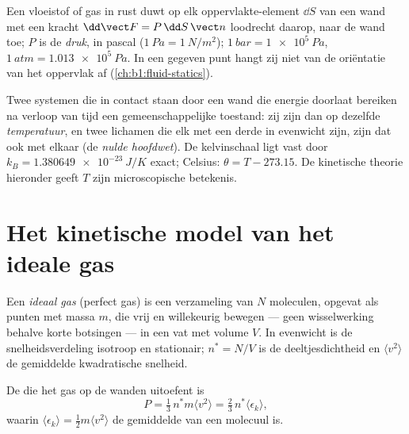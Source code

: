 \begin{definition}[Druk]\label{def:b1:kinetic-theory:pressure}
Een vloeistof of gas in rust duwt op elk oppervlakte-element $\dd S$ van een wand met een
kracht $\dd\vect F = P\,\dd S\,\vect n$ loodrecht daarop, naar de wand toe; $P$ is
de \emph{druk}, in pascal ($\qty{1}{Pa} = \qty{1}{N/m^2}$); $\qty{1}{bar}
= \qty{1e5}{Pa}$, $\qty{1}{atm} = \qty{1.013e5}{Pa}$. In een gegeven punt hangt zij
niet van de oriëntatie van het oppervlak af (\cref{ch:b1:fluid-statics}).
\end{definition}

\begin{definition}[Temperatuur]\label{def:b1:kinetic-theory:temperature}
Twee systemen die in contact staan door een wand die energie doorlaat bereiken na
verloop van tijd een gemeenschappelijke toestand: zij zijn dan op dezelfde \emph{temperatuur}, en
twee lichamen die elk met een derde in evenwicht zijn, zijn dat ook met
elkaar (de \emph{nulde hoofdwet}). De kelvinschaal ligt vast door
$k_B = \qty{1.380649e-23}{J/K}$ exact; Celsius: $\theta = T - 273.15$. De
kinetische theorie hieronder geeft $T$ zijn microscopische betekenis.
\end{definition}

\section{Het kinetische model van het ideale gas}

\begin{definition}\label{def:b1:kinetic-theory:model}
Een \emph{ideaal gas} (perfect gas) is een verzameling van $N$ moleculen,
opgevat als punten met massa $m$, die vrij en willekeurig bewegen --- geen
wisselwerking behalve korte botsingen --- in een vat met volume $V$.
In evenwicht is de snelheidsverdeling isotroop en stationair;
$n^* = N/V$ is de deeltjesdichtheid en $\langle v^2\rangle$ de gemiddelde
kwadratische snelheid.
\end{definition}

\begin{theorem}\label{thm:b1:kinetic-theory:pressure}
De  die het gas op de wanden uitoefent is
\[
P = \tfrac13\,n^*m\langle v^2\rangle = \tfrac23\,n^*\langle\epsilon_k\rangle ,
\]
waarin $\langle\epsilon_k\rangle = \tfrac12 m\langle v^2\rangle$ de gemiddelde
 van een molecuul is.
\end{theorem}

